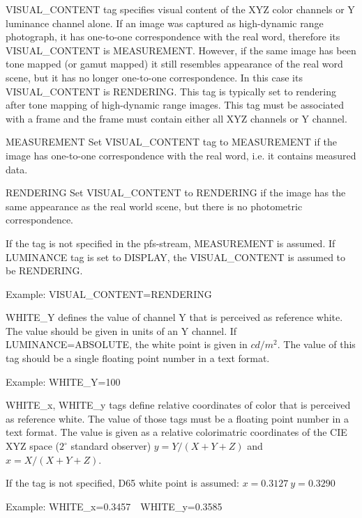 \documentclass[a4paper,12pt,english]{article}
\begin{document}
\begin{description}
 \item VISUAL\_CONTENT tag specifies visual content of the XYZ color
   channels or Y luminance channel alone. If an image was captured as
   high-dynamic range photograph, it has one-to-one correspondence
   with the real word, therefore its VISUAL\_CONTENT is MEASUREMENT.
   However, if the same image has been tone mapped (or gamut mapped)
   it still resembles appearance of the real word scene, but it has no
   longer one-to-one correspondence. In this case its VISUAL\_CONTENT
   is RENDERING.  This tag is typically set to rendering after tone
   mapping of high-dynamic range images. This tag must be associated
   with a frame and the frame must contain either all XYZ channels or
   Y channel.
   \begin{description}
   \item MEASUREMENT Set VISUAL\_CONTENT tag to MEASUREMENT if the
     image has one-to-one correspondence with the real word, i.e. it
     contains measured data.
   \item RENDERING Set VISUAL\_CONTENT to RENDERING if the image has the same
     appearance as the real world scene, but there is no photometric
     correspondence.
   \end{description}
   If the tag is not specified in the pfs-stream, MEASUREMENT is assumed.
   If LUMINANCE tag is set to DISPLAY, the VISUAL\_CONTENT is assumed to be
   RENDERING.

   Example: VISUAL\_CONTENT=RENDERING
   
 \item WHITE\_Y defines the value of channel Y that is perceived as
   reference white. The value should be given in units of an Y
   channel.  If LUMINANCE=ABSOLUTE, the white point is given in
   $cd/m^2$. The value of this tag should be a single floating point
   number in a text format.

   Example: WHITE\_Y=100
   
 \item WHITE\_x, WHITE\_y tags define relative coordinates of color
   that is perceived as reference white. The value of those tags must
   be a floating point number in a text format. The value is given
   as a relative colorimatric coordinates of the CIE XYZ space ($2^\circ$
   standard observer) $y=Y/(X+Y+Z)$ and $x=X/(X+Y+Z)$.

   If the tag is not specified, D65 white point is assumed: $x=0.3127\:y=0.3290$

   Example: WHITE\_x=0.3457~~WHITE\_y=0.3585


\end{description}
\end{document}
